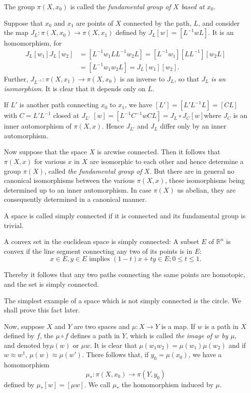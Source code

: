 The group $\pi(X,x_0)$ is called the \textit{fundamental group of
  $X$ based at $x_0$}. 


Suppose that $x_0$ and $x_1$ are points of $X$ connected by the path,
$L$, and consider the map $J_L: \pi (X,x_0) \to \pi (X, x_1)$ defined by
$J_L[w]=[L^{-1}wL]$. It is an homomorphism, for
\begin{align*}
J_L[w_1]J_L[w_2] &= [L^{-1}w_1 LL^{-1} w_2 L]=[L^{-1}w_1][LL^{-1}][w_2
  L]\\
&=[L^{-1}w_1 w_2L]=J_L [w_1][w_2].
\end{align*}
Further, $J_{L^{-1}} : \pi
(X,x_1) \to \pi (X,x_0)$ is an inverse to $J_L$, so that $J_L$
\textit{is an isomorphism}. It is clear that it depends only on $L$. 

If $L'$ is another path connecting $x_0$ to $x_1$, we have
$[L']=[L'L^{-1}L]=[CL]$ with $C=L'L^{-1}$ closed at $J_{L'}$
$[w]=[L^{-1}C^{-1}wCL]=J_L\circ J_C [w]$\pageoriginale where $J_C$ is an inner
automorphism of $\pi (X,x)$. Hence $J_{L'}$ and $J_L$ differ only by
an inner automorphism. 

Now suppose that the space $X$ is arcwise connected. Then it follows
that $\pi (X,x)$ for various $x$ in $X$ are isomorphic to each other
and hence determine a group $\pi (X)$, called \textit{the
  fundamental group of} $X$. But there are in general no canonical
isomorphisms between the various $\pi (X,x)$, these isomorphisms
being determined up to an inner automorphism. In case $\pi (X)$ us
abelian, they are consequently determined in a canonical manner. 

A space is called simply connected if it is connected and its
fundamental group is trivial. 

A convex set in the euclidean space is simply connected: A subset $E$
of $\mathbb{R}^n$ is convex if the line segment connecting any two of
its points is in $E$: 
$$
x \in E, y \in E \text{ implies } (1-t)x+ty \in E; 0 \leq t \leq 1.
$$

Thereby it follows that any two paths connecting the same points are
homotopic, and the set is simply connected. 

The simplest example of a space which is not simply connected is the
circle. We shall prove this fact later. 


Now, suppose $X$ and $Y$ are two spaces and $\mu :X \to Y$ is a
map. If $w$ is a path in $X$ defined by $f$, the $\mu\circ f$ defines a
path in $Y$, which is called \textit{the image of $w$ by $\mu$}, and
denoted by\pageoriginale $\mu(w)$ or $\mu w$. It is clear that $\mu
(w_1 w_2)=\mu 
(w_1)\mu(w_2)$ and if $w \approx w^1$, $\mu(w) \approx \mu
(w')$. There follows that, if $y_0= \mu (x_0)$, we have a homomorphism 
$$
\mu_\ast: \pi (X,x_0) \to \pi (Y,y_0)
$$ 
defined by $\mu_\ast [w]= [\mu w]$. We call $\mu_\ast$ the homomorphism
induced by $\mu$. 

